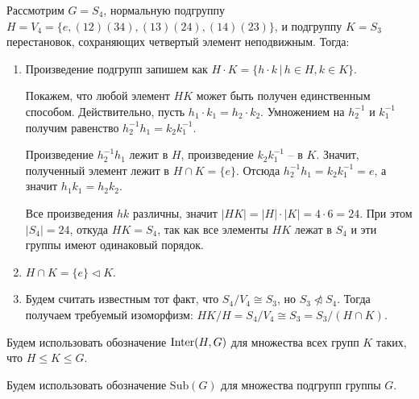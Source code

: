 
\begin{example}
    Рассмотрим $G = S_4$, нормальную подгруппу $H = V_4 = \{e, (1 2)(3 4), (1 3)(2 4), (1 4)(2 3)\}$,
    и подгруппу $K = S_3$ перестановок, сохраняющих четвертый элемент неподвижным. Тогда:
    \begin{enumerate}
        \item Произведение подгрупп запишем как $H \cdot K = \{h\cdot k \, \vert \, h \in H, k \in K \}$.
        
        Покажем, что любой элемент $HK$ может быть получен единственным способом. Действительно, 
        пусть $h_1 \cdot k_1 = h_2 \cdot k_2$. Умножением на $h_2^{-1}$ и $k_1^{-1}$ получим равенство 
        $h_2^{-1} h_1 = k_2 k_1^{-1}$. 
        
        Произведение $h_2^{-1} h_1$ лежит в $H$, произведение $k_2 k_1^{-1}$ -- в $K$. Значит, 
        полученный элемент лежит в $H \cap K = \{e\}$. Отсюда 
        $h_2^{-1} h_1 = k_2 k_1^{-1} = e$, а значит $h_1k_1 = h_2k_2$.

        Все произведения $hk$ различны, значит $|HK| = |H|\cdot|K| = 4 \cdot 6 = 24$. При этом $|S_4| = 24$, 
        откуда $HK = S_4$, так как все элементы $HK$ лежат в $S_4$ и эти группы имеют одинаковый порядок.
        \item $H \cap K = \{e\} \vartriangleleft K$.
        \item Будем считать известным тот факт, что $S_4/V_4 \cong S_3$, но $S_3 
        \not\vartriangleleft S_4$. Тогда получаем требуемый изоморфизм: $HK/H = S_4/V_4 \cong S_3 
        = S_3/(H\cap K)$.
    \end{enumerate} 
\end{example}

\begin{definition}
    Будем использовать обозначение $\operatorname{\text{Inter}}(H, G)$ для множества всех групп $K$ таких, что $H \leq K \leq G$.
\end{definition}

\begin{definition}
    Будем использовать обозначение $\text{Sub}(G)$ для множества подгрупп группы $G$.
\end{definition}

